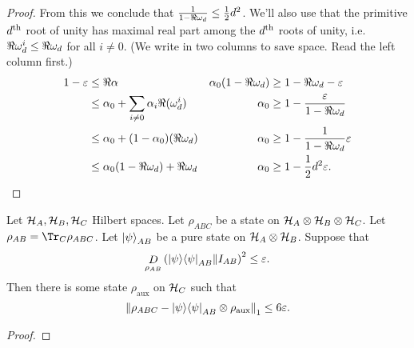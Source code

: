 \begin{appendices}
\begin{proof}
\noindent
From this we conclude that $\frac{1}{1 - \Re\omega_d} \leq \frac12d^2$.
 We'll also use that the primitive $d\textsuperscript{th}$ root of unity has maximal real part among the $d\textsuperscript{th}$ roots of unity, i.e.\ $\Re \omega_d^i \leq\Re \omega_d$ for all $i\neq 0$. (We write in two columns to save space. Read the left column first.)
	\begin{align}
		1-\varepsilon& \leq \Re \alpha
		& \alpha_0(1-\Re\omega_d) &\geq 1 - \Re\omega_d - \varepsilon
		\\	& \leq \alpha_0 + \sum_{i\neq 0} \alpha_i \Re (\omega_d^i)
		& \alpha_0 &\geq 1 - \frac{\varepsilon}{1 - \Re\omega_d}
		\\	& \leq \alpha_0 + (1-\alpha_0)(\Re \omega_d)
		& \alpha_0 &\geq 1 - \frac{1}{1 - \Re\omega_d} \varepsilon
		\\	& \leq \alpha_0(1- \Re\omega_d) + \Re \omega_d
		& \alpha_0 &\geq 1 - \frac12d^2 \varepsilon.
	\end{align}
\end{proof}

\begin{lemma}\label{lemma:entanglement-monogamy}
	Let $\mathcal H_A, \mathcal H_B, \mathcal H_C$ Hilbert spaces. Let $\rho_{ABC}$ be a state on $\mathcal H_A\otimes \mathcal H_B\otimes \mathcal H_C$. Let $\rho_{AB} = \Tr_C \rho_{ABC}$. Let $\ket\psi_{AB}$ be a pure state on $\mathcal H_A\otimes \mathcal H_B$. Suppose that 
	\begin{equation}
	\label{eq:assumption-entanglement-monogamy}
		\mathop{D}\limits_{\rho_{AB}}\left(\ket{\psi}\!\bra{\psi}_{AB}\middle\| I_{AB}\right)^2 \leq \varepsilon. 
	\end{equation}
	Then there is some state $\rho_{\text{aux}}$ on $\mathcal H_C$ such that 
	\begin{equation}
		\left\Vert\rho_{ABC} - \ket{\psi}\!\bra{\psi}_{AB}\otimes \rho_{\text{aux}}\right\Vert_1 \leq 6\varepsilon.
	\end{equation}
\end{lemma}
\begin{proof}


\end{proof}
\end{appendices}
